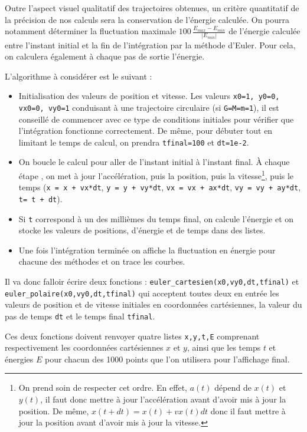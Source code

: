 Outre l'aspect visuel qualitatif des trajectoires obtenues, un critère quantitatif de la précision de nos calculs sera la conservation de l'énergie calculée. On pourra notamment déterminer la fluctuation maximale $100\,\frac{E_{max}-E_{min}}{|E_{min}|}$ de l'énergie calculée entre l'instant initial et la fin de l'intégration par la méthode d'Euler. Pour cela, on calculera également à chaque pas de sortie l'énergie. 

\newpage

L’algorithme à considérer est le suivant :
 \begin{itemize}
\item Initialisation des valeurs de position et vitesse. Les valeurs \verb|x0=1, y0=0, vx0=0, vy0=1| conduisant à une trajectoire circulaire (si \verb|G=M=m=1|), il est conseillé de commencer avec ce type de conditions initiales pour vérifier que l'intégration fonctionne correctement. De même, pour débuter tout en limitant le temps de calcul, on prendra \verb|tfinal=100| et \verb|dt=1e-2|.
\item On boucle le calcul pour aller de l'instant initial à l'instant final. À chaque étape , on met à jour l'accélération, puis la position, puis la vitesse\footnote{On prend soin de respecter cet ordre. En effet, $a(t)$ dépend de $x(t)$ et $y(t)$, il faut donc mettre à jour l'accélération avant d'avoir mis à jour la position. De même, $x(t+dt) = x(t) + vx(t) dt$ donc il faut mettre à jour la position avant d'avoir mis à jour la vitesse.}, puis le temps (\verb|x = x + vx*dt|, \verb|y = y + vy*dt|, \verb|vx = vx + ax*dt|, \verb|vy = vy + ay*dt|,  \verb|t= t + dt|).
 \item Si \verb|t| correspond à un des millièmes du temps final, on calcule l'énergie et on stocke les valeurs de positions, d'énergie et de temps dans des listes. 
 \item Une fois l'intégration terminée on affiche la fluctuation en énergie pour chacune des méthodes et on trace les courbes. 
\end{itemize}

Il va donc falloir écrire deux fonctions : \verb|euler_cartesien(x0,vy0,dt,tfinal)| et\\ \verb|euler_polaire(x0,vy0,dt,tfinal)| qui acceptent toutes deux en entrée les valeurs de position et de vitesse initiales en coordonnées cartésiennes, la valeur du pas de temps \verb|dt| et le temps final \verb|tfinal|. 

Ces deux fonctions doivent renvoyer quatre listes \verb|x,y,t,E| comprenant respectivement les coordonnées cartésiennes $x$ et $y$, ainsi que les temps $t$ et énergies $E$ pour chacun des 1000 points que l’on utilisera pour l’affichage final. 

